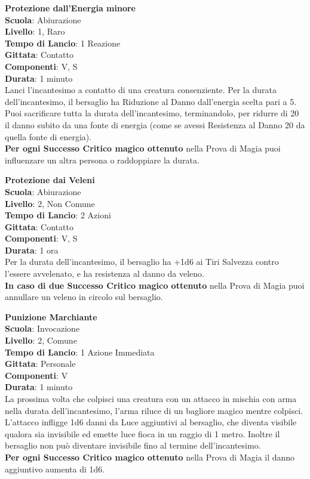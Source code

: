 \begin{multicols}{2}
\medskip\textbf{Protezione dall'Energia minore}\\
\textbf{Scuola}: Abiurazione\\
\textbf{Livello}: 1, Raro\\
\textbf{Tempo di Lancio}: 1 Reazione\\
\textbf{Gittata}: Contatto\\
\textbf{Componenti}: V, S\\
\textbf{Durata}: 1 minuto\\
Lanci l'incantesimo a contatto di una creatura consenziente. Per la durata dell'incantesimo, il bersaglio ha Riduzione al Danno dall'energia scelta pari a 5. Puoi sacrificare tutta la durata dell'incantesimo, terminandolo, per ridurre di 20 il danno subito da una fonte di energia (come se avessi Resistenza al Danno 20 da quella fonte di energia).\\
\textbf{Per ogni Successo Critico magico ottenuto} nella Prova di Magia puoi influenzare un altra persona o raddoppiare la durata.

\medskip\textbf{Protezione dai Veleni}\\
\textbf{Scuola}: Abiurazione\\
\textbf{Livello}: 2, Non Comune\\
\textbf{Tempo di Lancio}: 2 Azioni\\
\textbf{Gittata}: Contatto\\
\textbf{Componenti}: V, S\\
\textbf{Durata}: 1 ora\\
Per la durata dell'incantesimo, il bersaglio ha +1d6 ai Tiri Salvezza contro l'essere avvelenato, e ha resistenza al danno da veleno.\\
\textbf{In caso di due Successo Critico magico ottenuto} nella Prova di Magia puoi annullare un veleno in circolo sul bersaglio.

\medskip\textbf{Punizione Marchiante}\\
\textbf{Scuola}: Invocazione\\
\textbf{Livello}: 2, Comune\\
\textbf{Tempo di Lancio}: 1 Azione Immediata\\
\textbf{Gittata}: Personale\\
\textbf{Componenti}: V\\
\textbf{Durata}: 1 minuto\\
La prossima volta che colpisci una creatura con un attacco in mischia con arma nella durata dell'incantesimo, l'arma riluce di un bagliore magico mentre colpisci. L'attacco infligge 1d6 danni da Luce aggiuntivi al bersaglio, che diventa visibile qualora sia invisibile ed emette luce fioca in un raggio di 1 metro. Inoltre il bersaglio non può diventare invisibile fino al termine dell'incantesimo. \\
\textbf{Per ogni Successo Critico magico ottenuto} nella Prova di Magia il danno aggiuntivo aumenta di 1d6.


\end{multicols}
